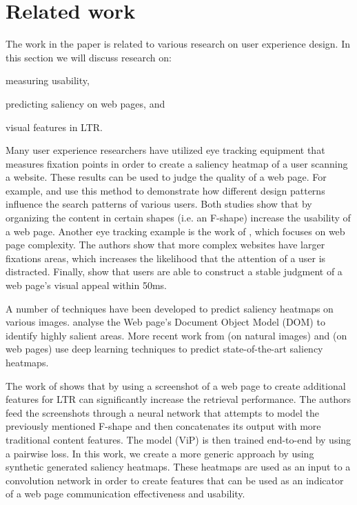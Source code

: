 
\section{Related work}\label{sec:relatedwork}
The work in the paper is related to various research on user experience design. In this section we will discuss research on:
\begin{inparaenum}[(i)]
\item measuring usability, 
\item predicting saliency on web pages, and 
\item visual features in \ac{LTR}.
\end{inparaenum} 


Many user experience researchers have utilized eye tracking equipment that measures fixation points in order to create a saliency heatmap of a user scanning a website. These results can be used to judge the quality of a web page. For example, \citet{nielsen2006f} and \citet{pernice2017f} use this method to demonstrate how different design patterns influence the search patterns of various users. Both studies show that by organizing the content in certain shapes (i.e. an F-shape) increase the usability of a web page. Another eye tracking example is the work of \citet{wang2014eye}, which focuses on web page complexity. The authors show that more complex websites have larger fixations areas, which increases the likelihood that the attention of a user is distracted. Finally, \citet{lindgaard2006attention} show that users are able to construct a stable judgment of a web page's visual appeal within 50ms. 

A number of techniques have been developed to predict saliency heatmaps on various images. \citet{buscher2009you} analyse the Web page's Document Object Model (DOM) to identify highly salient areas. More recent work from \citet{kummerer2016deepgaze} (on natural images) and \citet{shan2017two} (on web pages) use deep learning techniques to predict state-of-the-art saliency heatmaps. 

The work of \citet{fan2017learning} shows that by using a screenshot of a web page to create additional features for LTR can significantly increase the retrieval performance. The authors feed the screenshots through a neural network that attempts to model the previously mentioned F-shape and then concatenates its output with more traditional content features. The model (ViP) is then trained end-to-end by using a pairwise loss. In this work, we create a more generic approach by using synthetic generated saliency heatmaps. These heatmaps are used as an input to a convolution network in order to create features that can be used as an indicator of a web page communication effectiveness and usability. 

